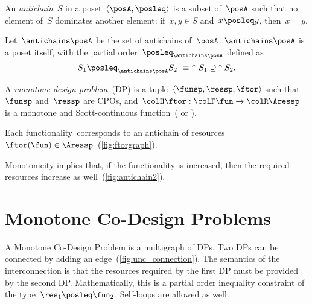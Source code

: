 \begin{definition}\label{def:antichain-paper2}
  An \emph{antichain}~$S$ in a poset~$\left\langle \posA,\posleq\right\rangle $
  is a subset of~$\posA$ such that no element of~$S$ dominates another
  element: if~$x,y\in S$ and~$x\posleq y$, then~$x=y$.
\end{definition}
\begin{lemma}\label{lem:orderantichains}
  Let~$\antichains\posA$ be the set of antichains of~$\posA$. $\antichains\posA$
  is a poset itself, with the partial order~$\posleq_{\antichains\posA}$
  defined as
  \begin{equation}
    S_{1}\posleq_{\antichains\posA}S_{2}\ \equiv\ \uparrow S_{1}\supseteq\,\uparrow S_{2}.\label{eq:orderantichains}
  \end{equation}
\end{lemma}
\begin{definition}
  \label{def:A-monotone-design}A\emph{ monotone design problem~}(DP)
  is a tuple~$\left\langle \funsp,\ressp,\ftor\right\rangle $ such
  that~$\funsp$ and~$\ressp$ are CPOs, and~${\colH\ftor}:{\colF\fun}\rightarrow{\colR\Aressp}$
  is a monotone and Scott-continuous function~(\cite{gierz03continuous}
  or \cite[Definition 11]{censi16codesign_sep16}).
\end{definition}

\noindent Each functionality~\fun corresponds to an antichain
of resources~$\ftor(\fun)\in\Aressp$~(\cref{fig:ftorgraph}).


\noindent Monotonicity implies that, if the functionality is increased,
then the required resources increase as well~(\cref{fig:antichain2}).



\section{Monotone Co-Design Problems }

A Monotone Co-Design Problem is a multigraph of DPs. Two DPs can be
connected by adding an edge~(\cref{fig:unc_connection}). The semantics
of the interconnection is that the resources required by the first
DP must be provided by the second DP. Mathematically, this is a partial
order inequality constraint of the type~$\res_{1}\posleq\fun_{2}$.
Self-loops are allowed as well.

